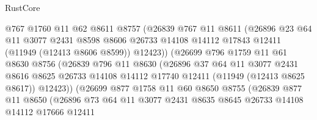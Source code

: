 \begin{lexlean}{RustCore}
\begin{coremodule}
                        @767
                        @1760
                        @11
                        @62
                        @8611
                        @8757
                        (@26839
                          @767
                          @11
                          @8611
                          (@26896
                            @23
                            @64
                            @11
                            @3077
                            @2431
                            @8598
                            @8606
                            @26733
                            @14108
                            @14112
                            @17843
                            @12411
                            (@11949 (@12413 @8606 @8599))
                            @12423))
                        (@26699
                          @796
                          @1759
                          @11
                          @61
                          @8630
                          @8756
                          (@26839
                            @796
                            @11
                            @8630
                            (@26896
                              @37
                              @64
                              @11
                              @3077
                              @2431
                              @8616
                              @8625
                              @26733
                              @14108
                              @14112
                              @17740
                              @12411
                              (@11949 (@12413 @8625 @8617))
                              @12423))
                          (@26699
                            @877
                            @1758
                            @11
                            @60
                            @8650
                            @8755
                            (@26839
                              @877
                              @11
                              @8650
                              (@26896
                                @73
                                @64
                                @11
                                @3077
                                @2431
                                @8635
                                @8645
                                @26733
                                @14108
                                @14112
                                @17666
                                @12411

\end{coremodule}
\end{lexlean}
